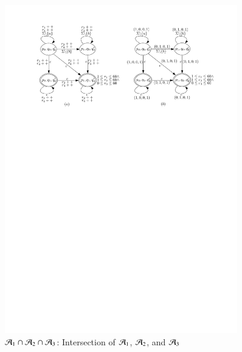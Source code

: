 \begin{figure}[ht]
\vspace{-4mm}
  \centering
  \includegraphics[width = 0.9\textwidth]{sections/overview-cefa-product.pdf}
  \caption{$\mathcal{A}_1 \cap \mathcal{A}_2 \cap \mathcal{A}_3$: Intersection of $\mathcal{A}_1$, $\mathcal{A}_2$, and $\mathcal{A}_3$}
  \label{fig:overview:product}
\vspace{-4mm}
\end{figure}

